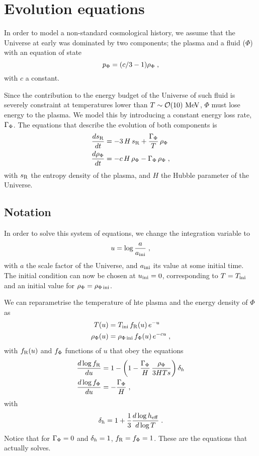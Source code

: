 \documentclass[11pt,a4paper]{article}
\begin{document}
\section{Evolution equations}\label{sec:equations}
\setcounter{equation}{0}

In order to model a non-standard cosmological history, we assume that the Universe at early was dominated by two components; the plasma and a fluid ($\Phi$) with an equation of state
%
\begin{equation}
	p_{\Phi} = (c/3-1) \rho_{\Phi} \;,
	\label{eq:EOS}
\end{equation}  
%
with $c$ a constant. 

Since the contribution to the energy budget of the Universe of such fluid is severely constraint at temperatures lower than $T \sim \mathcal{O}(10)~{\rm MeV}$, $\Phi$ must lose energy to the plasma. We model this by introducing a constant energy loss rate, $\Gamma_{\Phi}$. The equations that describe the evolution of both components is
%
\begin{align}
	\dfrac{ds_{\rm R}}{dt} &= -3 \, H  \, s_{\rm R} + \dfrac{\Gamma_{\Phi}}{T} \, \rho_{\Phi} \label{eq:dsdt} \\ 
	\dfrac{d\rho_{\Phi}}{dt} &= - c \, H \, \rho_{\Phi} - \Gamma_{\Phi} \, \rho_{\Phi} \label{eq:drhoPhidt } \;,
\end{align}
%
with $s_{\rm R}$ the entropy density of the plasma, and $H$ the Hubble parameter of the Universe. 


\subsection{Notation}\label{sec:notation}

In order to solve this system of equations, we change the integration variable to 
%
\begin{equation}
	u=\log\frac{a}{a_{\rm ini}{}}\;,	
	\label{eq:u_def}
\end{equation}
%
with $a$ the scale factor of the Universe, and $a_{\rm ini}{}$ its value at some initial time. The initial condition can now be chosen at $u_{\rm ini}{}=0$, corresponding to $T=T_{\rm ini}{}$ and an initial value for $\rho_{\Phi}=\rho_{\Phi\,{\rm ini}}$. 

We can reparametrise the temperature of hte plasma and the energy density of $\Phi$ as 
%
\begin{align}
	T(u) &= T_{\rm ini}{}  \, f_{\rm R}(u) \, e^{-u}  \label{eq:fR_def} \\ 
	\rho_{\Phi}(u) &= \rho_{\Phi\,{\rm ini}} \, f_{\Phi}(u) \label{eq:fPhi_def} \, e^{-cu}\;,
\end{align}
%
with $f_{\rm R}(u)$ and $f_{\Phi}$ functions of $u$ that obey the equations
%
\begin{align}
	\dfrac{d\log f_{\rm R} }{du} &=  1- \left( 1- \dfrac{\Gamma_{\Phi}}{H} \, \dfrac{\rho_{\Phi}}{3HTs}   \right) \delta_h{}  \label{eq:dlogfRdu} \\ 
	\dfrac{d\log f_{\Phi}}{du} &= -\dfrac{\Gamma_{\Phi}}{H} \label{eq:dlogfPhidu } \;,
\end{align}
%
with 
\begin{equation}
	\delta_h{} = 1+ \dfrac{1}{3} \dfrac{d\log h_{\rm eff}{}}{d\log T}\;.
	\label{eq:dh_def}
\end{equation}
%
Notice that  for $\Gamma_{\Phi}=0$ and $\delta_h{}=1$, $f_{\rm R}=f_{\Phi}=1$. These are the equations that \nsc actually solves. 
\end{document}
